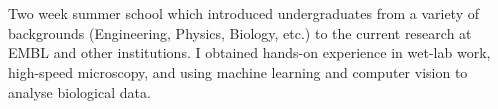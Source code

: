 \documentclass[10pt,a4paper,ragged2e,withhyper]{altacv}
\begin{document}
\begin{paracol}{2}
\divider

\vspace{-0.5em}

\\{}

\divider

\vspace{-0.5em}

\\


\end{paracol}

\vspace{2mm}
Two week summer school which introduced undergraduates from a variety of backgrounds (Engineering, Physics, Biology, etc.) to the current research at EMBL and other institutions. I obtained hands-on experience in wet-lab work, high-speed microscopy, and using machine learning and computer vision to analyse biological data.
\end{document}
